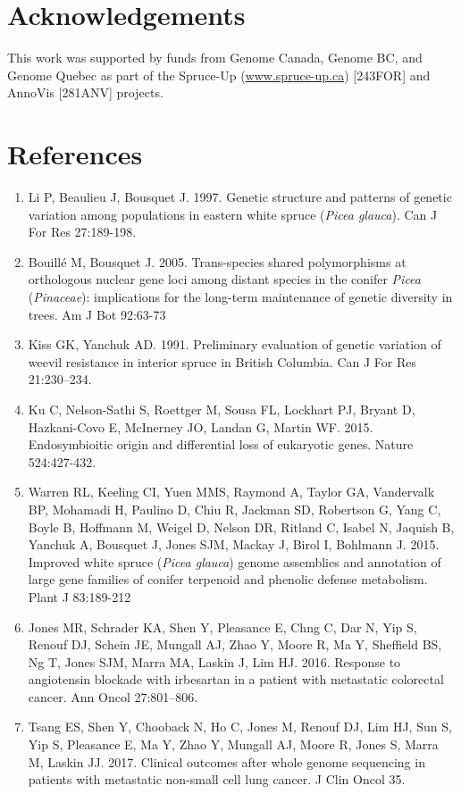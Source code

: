 \documentclass[titlepage,11pt, oneside]{article}   	%
\begin{document}
\section*{Acknowledgements}
This work was supported by funds from Genome Canada, Genome BC, and Genome Quebec as part of the Spruce-Up (\url{www.spruce-up.ca}) [243FOR] and AnnoVis [281ANV] projects.

\section*{References}

\begin{enumerate}
\item  Li P, Beaulieu J, Bousquet J. 1997. Genetic structure and patterns of genetic variation among populations in eastern white spruce (\textit{Picea glauca}). Can J For Res 27:189-198.
\item Bouillé M, Bousquet J. 2005. Trans-species shared polymorphisms at orthologous nuclear gene loci among distant species in the conifer \textit{Picea} (\textit{Pinaceae}): implications for the long-term maintenance of genetic diversity in trees. Am J Bot 92:63-73
\item Kiss GK, Yanchuk AD. 1991. Preliminary evaluation of genetic variation of weevil resistance in interior spruce in British Columbia. Can J For Res 21:230–234.
\item Ku C, Nelson-Sathi S, Roettger M, Sousa FL, Lockhart PJ, Bryant D, Hazkani-Covo E, McInerney JO, Landan G, Martin WF. 2015. Endosymbioitic origin and differential loss of eukaryotic genes. Nature 524:427-432.
\item Warren RL, Keeling CI, Yuen MMS, Raymond A, Taylor GA, Vandervalk BP, Mohamadi H, Paulino D, Chiu R, Jackman SD, Robertson G, Yang C, Boyle B, Hoffmann M, Weigel D, Nelson DR, Ritland C, Isabel N, Jaquish B, Yanchuk A, Bousquet J, Jones SJM, Mackay J, Birol I, Bohlmann J. 2015. Improved white spruce (\textit{Picea glauca}) genome assemblies and annotation of large gene families of conifer terpenoid and phenolic defense metabolism. Plant J 83:189-212
\item Jones MR, Schrader KA, Shen Y, Pleasance E, Chng C, Dar N, Yip S, Renouf DJ, Schein JE, Mungall AJ, Zhao Y, Moore R, Ma Y, Sheffield BS, Ng T, Jones SJM, Marra MA, Laskin J, Lim HJ. 2016. Response to angiotensin blockade with irbesartan in a patient with metastatic colorectal cancer. Ann Oncol 27:801–806.
\item Tsang ES, Shen Y, Chooback N, Ho C, Jones M, Renouf DJ, Lim HJ, Sun S, Yip S, Pleasance E, Ma Y, Zhao Y, Mungall AJ, Moore R, Jones S, Marra M, Laskin JJ. 2017. Clinical outcomes after whole genome sequencing in patients with metastatic non-small cell lung cancer. J Clin Oncol 35.

\end{enumerate}
\end{document}
